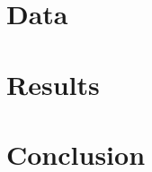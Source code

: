 \section{Data}


\section{Results}


\section{Conclusion}



\clearpage
\printbibliography
\clearpage

%
%
%
% 


